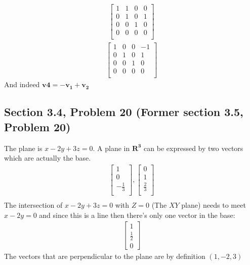 \documentclass[a4paper,11pt]{article}
\newcommand{\mybf}[1]{\boldsymbol{#1}}
\begin{document}
\begin{align}
\left[
\begin{array}{ccc|c}
1  & 1  & 0  & 0  \\
0  & 1  & 0  & 1  \\
0  & 0  & 1  & 0  \\
0  & 0  & 0  & 0  \\
\end{array}
\right]
\end{align}
\begin{align}
\left[
\begin{array}{ccc|c}
1  & 0  & 0  & -1  \\
0  & 1  & 0  & 1   \\
0  & 0  & 1  & 0   \\
0  & 0  & 0  & 0   \\
\end{array}
\right]
\end{align}
And indeed $\mybf{v4} = -\mybf{v_1}+\mybf{v_2}$
\subsection*{Section 3.4, Problem 20  (Former section 3.5, Problem 20)}
The plane is $x-2y+3z=0$. A plane in $\mybf{R^3}$ can be expressed by two vectors which are actually the base.
\begin{align}
\begin{bmatrix}
1 \\
0 \\
-\frac{1}{3} \\
\end{bmatrix},
\begin{bmatrix}
0 \\
1 \\
\frac{2}{3} \\
\end{bmatrix} \\
\end{align}
The intersection of $x-2y+3z=0$ with $Z=0$ (The $XY$ plane) needs to meet $x-2y=0$ and since this is a line then there's only one vector in the base:
\begin{align}
\begin{bmatrix}
1 \\
\frac{1}{2} \\
0
\end{bmatrix}
\end{align}
The vectors that are perpendicular to the plane are by definition $(1,-2,3)$
\end{document}
